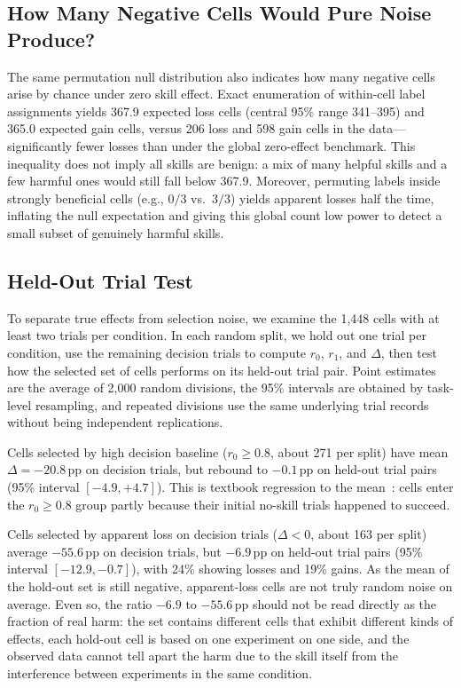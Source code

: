 \documentclass[10pt,conference]{IEEEtran}
\begin{document}
\subsection{How Many Negative Cells Would Pure Noise Produce?}
The same permutation null distribution also indicates how many negative cells arise by chance under zero skill effect. Exact enumeration of within-cell label assignments yields 367.9 expected loss cells (central 95\% range 341--395) and 365.0 expected gain cells, versus 206 loss and 598 gain cells in the data---significantly fewer losses than under the global zero-effect benchmark. This inequality does not imply all skills are benign: a mix of many helpful skills and a few harmful ones would still fall below 367.9. Moreover, permuting labels inside strongly beneficial cells (e.g., $0/3$ vs.\ $3/3$) yields apparent losses half the time, inflating the null expectation and giving this global count low power to detect a small subset of genuinely harmful skills.

\subsection{Held-Out Trial Test}
To separate true effects from selection noise, we examine the 1,448 cells with at least two trials per condition. In each random split, we hold out one trial per condition, use the remaining decision trials to compute $r_{0}$, $r_{1}$, and $\Delta$, then test how the selected set of cells performs on its held-out trial pair. Point estimates are the average of 2,000 random divisions, the 95\% intervals are obtained by task-level resampling, and repeated divisions use the same underlying trial records without being independent replications.

Cells selected by high decision baseline ($r_{0}\ge0.8$, about 271 per split) have mean $\Delta=-20.8$\,pp on decision trials, but rebound to $-0.1$\,pp on held-out trial pairs (95\% interval $[-4.9,+4.7]$). This is textbook regression to the mean~\cite{barnett2005regression}: cells enter the $r_{0}\ge0.8$ group partly because their initial no-skill trials happened to succeed.

Cells selected by apparent loss on decision trials ($\Delta<0$, about 163 per split) average $-55.6$\,pp on decision trials, but $-6.9$\,pp on held-out trial pairs (95\% interval $[-12.9,-0.7]$), with 24\% showing losses and 19\% gains. As the mean of the hold-out set is still negative, apparent-loss cells are not truly random noise on average. Even so, the ratio $-6.9$ to $-55.6$\,pp should not be read directly as the fraction of real harm: the set contains different cells that exhibit different kinds of effects, each hold-out cell is based on one experiment on one side, and the observed data cannot tell apart the harm due to the skill itself from the interference between experiments in the same condition.
\end{document}
